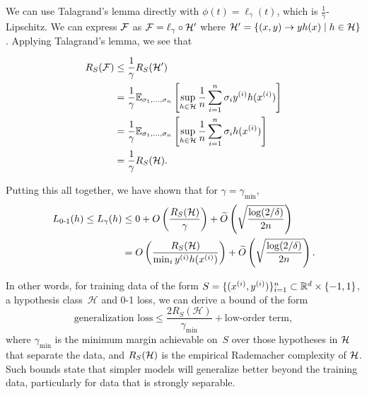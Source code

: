 We can use Talagrand's lemma directly with $\phi(t) = \ell_\gamma(t)$, which is $\frac{1}{\gamma}$-Lipschitz. We can express $\cF$ as $\cF=\ell_\gamma\circ\cH'$ where $\cH' = \{(x,y)\to yh(x)\mid h\in\cH\}$. Applying Talagrand's lemma, we see that

\begin{align}
R_S(\cF) &\leq \frac{1}{\gamma}R_S(\cH') \\
&= \frac{1}{\gamma}\E_{\sigma_1,\dots, \sigma_n} \l[ \sup_{h\in \cH} \frac{1}{n} \sum^n_{i=1} \sigma_i y^{(i)}h(x^{(i)}) \r] \\
&= \frac{1}{\gamma}\E_{\sigma_1,\dots, \sigma_n} \l[ \sup_{h\in \cH} \frac{1}{n} \sum^n_{i=1} \sigma_i h(x^{(i)})  \r] \\
&= \frac{1}{\gamma}R_S(\cH).
\end{align}

Putting this all together, we have shown that for $\gamma = \gamma_{\min}$,
\begin{align}
\Err(h) \leq L_\gamma(h) &\leq 0 + O \left( \frac{R_S(\cH)}{\gamma} \right) + \tilO \left( \sqrt{\frac{\log (2 / \delta)}{2n}} \right) \\
&= O \left( \frac{R_S(\cH)}{\min_i y\sp{i} h(x\sp{i}) } \right) + \tilO \left( \sqrt{\frac{\log (2 / \delta)}{2n}} \right).
\end{align}

In other words, for training data of the form $S = \{(x\sp{i},y\sp{i})\}_{i=1}^n \subset \mathbb{R}^d \times \{-1,1\}$, a hypothesis class~$\mathcal{H}$ and 0-1 loss, we can derive a bound of the form
\begin{equation}\label{lec7:eqn:generalization_loss}
    \text{generalization loss} \leq \frac{2R_S(\mathcal{H})}{\gamma_{\mathrm{min}}} + \text{low-order term},
\end{equation}
where $\gamma_\mathrm{min}$ is the minimum margin achievable on~$S$ over those hypotheses in $\cH$ that separate the data, and $R_S(\cH)$ is the empirical Rademacher complexity of $\cH$. Such bounds state that simpler models will generalize better beyond the training data, particularly for data that is strongly separable.


